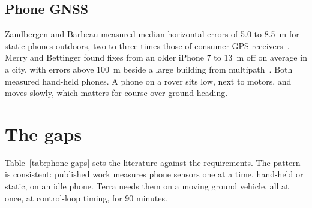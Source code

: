 \subsection{Phone GNSS}

Zandbergen and Barbeau measured median horizontal errors of 5.0 to 8.5~m for static phones outdoors, two to three times those of consumer GPS receivers~\citep{zandbergen2011agps}.
Merry and Bettinger found fixes from an older iPhone 7 to 13~m off on average in a city, with errors above 100~m beside a large building from multipath~\citep{merry2019smartphone}.
Both measured hand-held phones.
A phone on a rover sits low, next to motors, and moves slowly, which matters for course-over-ground heading.

\section{The gaps}
\label{sec:phone-gaps}

Table~\ref{tab:phone-gaps} sets the literature against the requirements.
The pattern is consistent: published work measures phone sensors one at a time, hand-held or static, on an idle phone.
Terra needs them on a moving ground vehicle, all at once, at control-loop timing, for 90 minutes.

